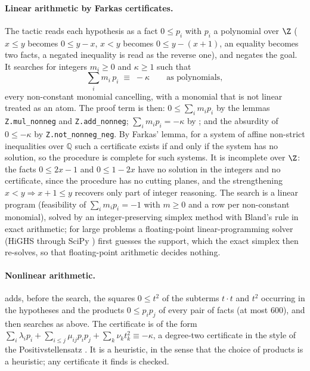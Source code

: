 \paragraph{Linear arithmetic by Farkas certificates.}
The tactic  reads each hypothesis as a fact $0\le p_i$ with $p_i$ a polynomial over $\Z$ ($x\le y$ becomes $0\le y-x$, $x<y$ becomes $0\le y-(x+1)$, an equality becomes two facts, a negated inequality is read as the reverse one), and negates the goal.
It searches for integers $m_i\ge0$ and $\kappa\ge1$ such that
\[
\sum_i m_i\,p_i \;\equiv\; -\kappa \qquad\text{as polynomials},
\]
every non-constant monomial cancelling, with a monomial that is not linear treated as an atom.
The proof term is then: $0\le\sum_i m_i p_i$ by the lemmas \texttt{Z.mul\_nonneg} and \texttt{Z.add\_nonneg}; $\sum_i m_ip_i=-\kappa$ by ; and the absurdity of $0\le-\kappa$ by \texttt{Z.not\_nonneg\_neg}.
By Farkas' lemma, for a system of affine non-strict inequalities over $\mathbb Q$ such a certificate exists if and only if the system has no solution, so the procedure is complete for such systems.
It is incomplete over $\Z$: the facts $0\le 2x-1$ and $0\le 1-2x$ have no solution in the integers and no certificate, since the procedure has no cutting planes, and the strengthening $x<y\Rightarrow x+1\le y$ recovers only part of integer reasoning.
The search is a linear program (feasibility of $\sum_i m_ip_i=-1$ with $m\ge0$ and a row per non-constant monomial), solved by an integer-preserving simplex method with Bland's rule \citep{bland77} in exact arithmetic; for large problems a floating-point linear-programming solver (HiGHS through SciPy \citep{huangfu18,scipy20}) first guesses the support, which the exact simplex then re-solves, so that floating-point arithmetic decides nothing.

\paragraph{Nonlinear arithmetic.}
 adds, before the search, the squares $0\le t^2$ of the subterms $t\cdot t$ and $t^2$ occurring in the hypotheses and the products $0\le p_ip_j$ of every pair of facts (at most $600$), and then searches as above.
The certificate is of the form $\sum_i\lambda_ip_i+\sum_{i\le j}\mu_{ij}p_ip_j+\sum_k\nu_kt_k^2\equiv-\kappa$, a degree-two certificate in the style of the Positivstellensatz \citep{harrison07}.
It is a heuristic, in the sense that the choice of products is a heuristic; any certificate it finds is checked.

